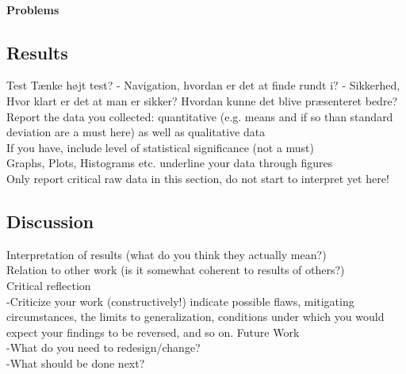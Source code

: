 \noindent
\\\textbf{Problems}\\

\subsection{Results}


Test
Tænke højt test?
- Navigation, hvordan er det at finde rundt i?
- Sikkerhed, 
    Hvor klart er det at man er sikker? 
    Hvordan kunne det blive præsenteret bedre?
\\
Report the data you collected: quantitative (e.g. means and if so than standard deviation are a must here) as well as qualitative data\\
If you have, include level of statistical significance (not a must)\\
Graphs, Plots, Histograms etc. underline your data through figures\\
Only report critical raw data in this section, do not start to interpret yet here!

\subsection{Discussion}

Interpretation of results (what do you think they actually mean?)\\
Relation to other work (is it somewhat coherent to results of others?)\\
Critical reflection\\
-Criticize your work (constructively!)  indicate possible flaws, mitigating circumstances, the limits to generalization, conditions under which you would expect your findings to be reversed, and so on.
Future Work\\
-What do you need to redesign/change?\\
-What should be done next?
